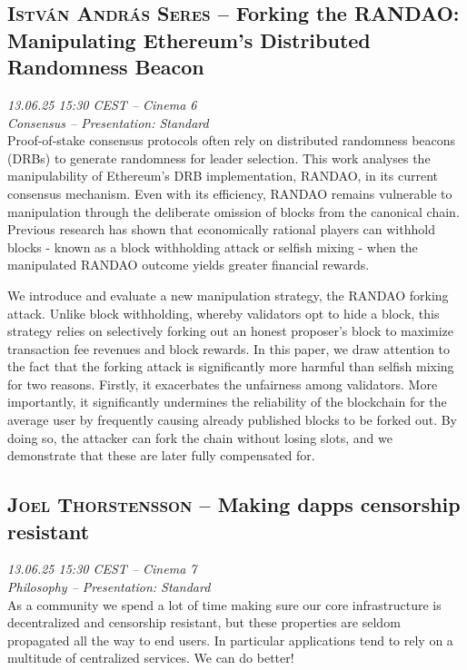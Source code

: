 \clearpage
\subsection {\textsc{István András Seres}  -- Forking the RANDAO: Manipulating Ethereum’s Distributed Randomness Beacon} \noindent \textit {13.06.25 15:30 CEST -- Cinema 6\\ Consensus -- Presentation: Standard}\\[1em] Proof-of-stake consensus protocols often rely on distributed randomness beacons (DRBs) to generate randomness for leader selection. This work analyses the manipulability of Ethereum's DRB implementation, RANDAO, in its current consensus mechanism. Even with its efficiency, RANDAO remains vulnerable to manipulation through the deliberate omission of blocks from the canonical chain. Previous research has shown that economically rational players can withhold blocks - known as a block withholding attack or selfish mixing - when the manipulated RANDAO outcome yields greater financial rewards.

We introduce and evaluate a new manipulation strategy, the RANDAO forking attack. Unlike block withholding, whereby validators opt to hide a block, this strategy relies on selectively forking out an honest proposer's block to maximize transaction fee revenues and block rewards. 
In this paper, we draw attention to the fact that the forking attack is significantly more harmful than selfish mixing for two reasons. Firstly, it exacerbates the unfairness among validators. More importantly, it significantly undermines the reliability of the blockchain for the average user by frequently causing already published blocks to be forked out. By doing so, the attacker can fork the chain without losing slots, and we demonstrate that these are later fully compensated for.

\clearpage
\subsection {\textsc{Joel Thorstensson}  -- Making dapps censorship resistant} \noindent \textit {13.06.25 15:30 CEST -- Cinema 7\\ Philosophy -- Presentation: Standard}\\[1em] As a community we spend a lot of time making sure our core infrastructure is decentralized and censorship resistant, but these properties are seldom propagated all the way to end users. In particular applications tend to rely on a multitude of centralized services. We can do better!

